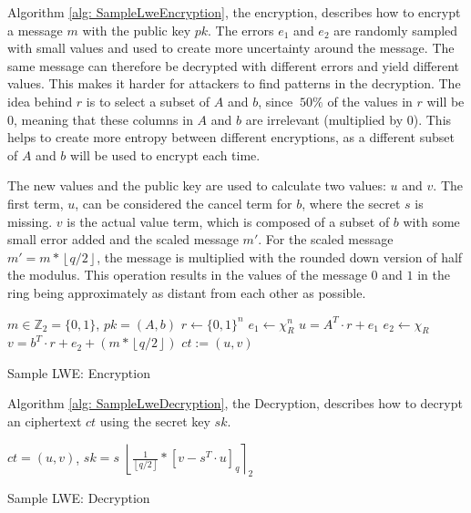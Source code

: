 Algorithm \ref{alg: SampleLweEncryption}, the encryption, describes how to encrypt a message $m$ with the public key $pk$. The errors $e_1$ and $e_2$ are randomly sampled with small values and used to create more uncertainty around the message. The same message can therefore be decrypted with different errors and yield different values. This makes it harder for attackers to find patterns in the decryption. The idea behind $r$ is to select a subset of $A$ and $b$, since $~50\%$ of the values in $r$ will be $0$, meaning that these columns in $A$ and $b$ are irrelevant (multiplied by $0$). This helps to create more entropy between different encryptions, as a different subset of $A$ and $b$ will be used to encrypt each time.

The new values and the public key are used to calculate two values: $u$ and $v$. The first term, $u$, can be considered the cancel term for $b$, where the secret $s$ is missing. $v$ is the actual value term, which is composed of a subset of $b$ with some small error added and the scaled message $m'$. For the scaled message $m' = m*\left\lfloor q/2\right\rfloor$, the message is multiplied with the rounded down version of half the modulus. This operation results in the values of the message $0$ and $1$ in the ring being approximately as distant from each other as possible.

\begin{algorithm}[htb]
  \begin{algorithmic}[1]
    \REQUIRE $m \in \mathbb{Z}_2 = \{0, 1\}$, $pk = (A, b)$
    \STATE $r \leftarrow \{0, 1\}^n$
    \STATE $e_1 \leftarrow \chi_R^n$
    \STATE $u = A^T \cdot r + e_1$
    \STATE $e_2 \leftarrow \chi_R$
    \STATE $v = b^T \cdot r + e_2 + (m*\left\lfloor q/2\right\rfloor)$
    \RETURN $ct := (u, v)$
  \end{algorithmic}
  \caption{Sample LWE: Encryption}
  \label{alg: SampleLweEncryption}
\end{algorithm}

Algorithm \ref{alg: SampleLweDecryption}, the Decryption, describes how to decrypt an ciphertext $ct$ using the secret key $sk$.



\begin{algorithm}[htb]
  \begin{algorithmic}[1]
    \REQUIRE $ct = (u, v)$, $sk = s$
    \RETURN $\left\lfloor \frac{1}{\left\lfloor q/2\right\rfloor}*\left[v-s^T \cdot u\right]_q\right\rceil _2$
  \end{algorithmic}
  \caption{Sample LWE: Decryption}
  \label{alg: SampleLweDecryption}
\end{algorithm}


